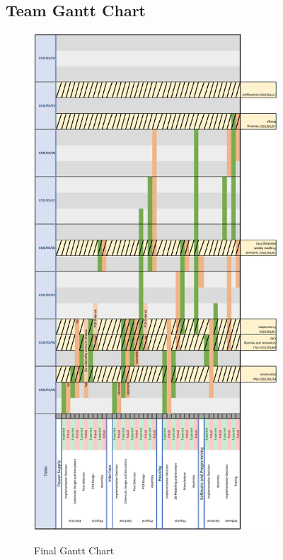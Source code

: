 \documentclass[9pt, technote, a4paper, nofonttune]{IEEEphot}
\begin{document}
\subsection{Team Gantt Chart}
\begin{figure}[h]
        \centering
        \includegraphics[width=21.5pc]{D5/GANTT.png}
        \label{fig_env1}
        \caption{Final Gantt Chart}
    \end{figure}
\end{document}
